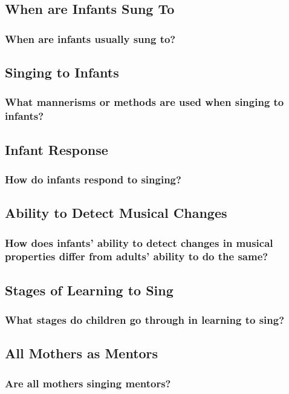 \documentclass{beamer}
\begin{document}
\subsection*{When are Infants Sung To}
\begin{frame}
	\frametitle{When are infants usually sung to?}
\end{frame}

\subsection*{Singing to Infants}
\begin{frame}
	\frametitle{What mannerisms or methods are used when singing to infants?}
\end{frame}

\subsection*{Infant Response}
\begin{frame}
	\frametitle{How do infants respond to singing?}
\end{frame}

\subsection*{Ability to Detect Musical Changes}
\begin{frame}
	\frametitle{How does infants' ability to detect changes in musical properties differ from adults' ability to do the same?}
\end{frame}

\subsection*{Stages of Learning to Sing}
\begin{frame}
	\frametitle{What stages do children go through in learning to sing?}
\end{frame}

\subsection*{All Mothers as Mentors}
\begin{frame}
	\frametitle{Are all mothers singing mentors?}
\end{frame}

\end{document}
